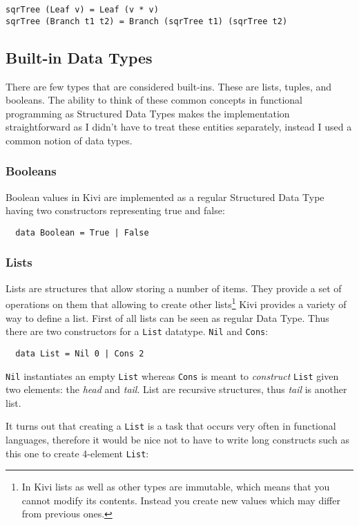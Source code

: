 \documentclass[a4paper]{report}
\begin{document}
\begin{lstlisting}[label=lst:sqr_tree,caption={Creating a `square rooted` tree.}]
sqrTree (Leaf v) = Leaf (v * v)
sqrTree (Branch t1 t2) = Branch (sqrTree t1) (sqrTree t2)
\end{lstlisting}

\subsection{Built-in Data Types}
There are few types that are considered built-ins. These are lists, tuples,
and booleans. The ability to think of these common concepts in functional
programming as Structured Data Types makes the implementation straightforward
as I didn't have to treat these entities separately, instead I used a common
notion of data types.
\subsubsection{Booleans}
Boolean values in Kivi are implemented as a regular Structured Data Type having
two constructors representing true and false:

\begin{verbatim}
  data Boolean = True | False
\end{verbatim}

\subsubsection{Lists}
Lists are structures that allow storing a number of items. They
provide a set of operations on them that allowing to create other
lists\footnote{In Kivi lists as well as other types are immutable, which means
that you cannot modify its contents. Instead you create new values which may
differ from previous ones. }
Kivi provides a variety of way to define a list. First of all lists can be seen
as regular Data Type. Thus there are two constructors for a \texttt{List}
datatype. \texttt{Nil} and \texttt{Cons}:

\begin{verbatim}
  data List = Nil 0 | Cons 2
\end{verbatim}

\texttt{Nil} instantiates an empty \texttt{List} whereas \texttt{Cons} is meant
to \textit{construct} \texttt{List} given two elements: the \textit{head} and
\textit{tail}. List are recursive structures, thus \textit{tail} is another
list.

It turns out that creating a \texttt{List} is a task that occurs very often in
functional languages, therefore it would be nice not to have to write long
constructs such as this one to create 4-element \texttt{List}:
\end{document}
